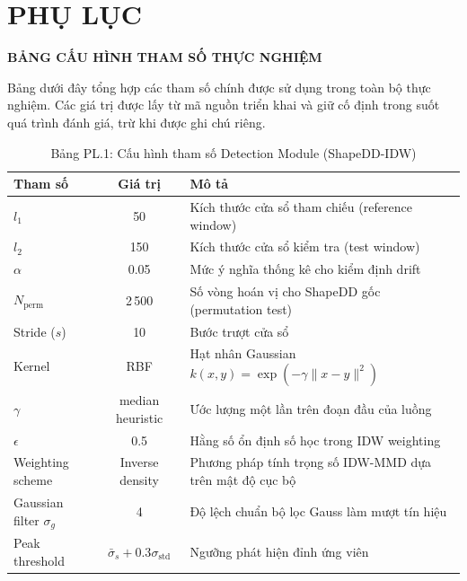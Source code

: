 \chapter*{PHỤ LỤC}

\begin{center}
{\Huge\bfseries BẢNG CẤU HÌNH THAM SỐ THỰC NGHIỆM}
\end{center}

Bảng dưới đây tổng hợp các tham số chính được sử dụng trong toàn bộ thực nghiệm. Các giá trị được lấy từ mã nguồn triển khai và giữ cố định trong suốt quá trình đánh giá, trừ khi được ghi chú riêng.

\begin{table}[H]
	\centering
	\caption*{Bảng PL.1: Cấu hình tham số Detection Module (ShapeDD-IDW)}
	\begin{tabular}{|l|c|p{7cm}|}
		\hline
		\textbf{Tham số} & \textbf{Giá trị} & \textbf{Mô tả} \\
		\hline
		$l_1$ & 50 & Kích thước cửa sổ tham chiếu (reference window) \\
		$l_2$ & 150 & Kích thước cửa sổ kiểm tra (test window) \\
		$\alpha$ & 0.05 & Mức ý nghĩa thống kê cho kiểm định drift \\
		$N_{\text{perm}}$ & 2\,500 & Số vòng hoán vị cho ShapeDD gốc (permutation test) \\
		Stride ($s$) & 10 & Bước trượt cửa sổ \\
		Kernel & RBF & Hạt nhân Gaussian $k(x,y) = \exp(-\gamma \|x-y\|^2)$ \\
		$\gamma$ & median heuristic & Ước lượng một lần trên đoạn đầu của luồng \\
		$\epsilon$ & 0.5 & Hằng số ổn định số học trong IDW weighting \\
		Weighting scheme & Inverse density & Phương pháp tính trọng số IDW-MMD dựa trên mật độ cục bộ \\
		Gaussian filter $\sigma_g$ & 4 & Độ lệch chuẩn bộ lọc Gauss làm mượt tín hiệu \\
		Peak threshold & $\bar{\sigma}_s + 0.3\sigma_{\text{std}}$ & Ngưỡng phát hiện đỉnh ứng viên \\
		\hline
	\end{tabular}
\end{table}

